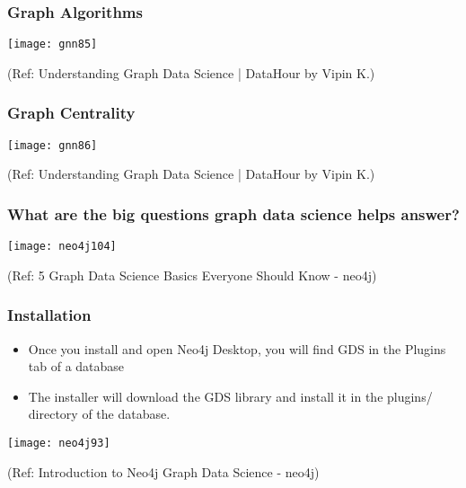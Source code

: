 \begin{frame}[fragile]\frametitle{Graph Algorithms}

\begin{center}
\texttt{[image: gnn85]}

{\tiny (Ref: Understanding Graph Data Science | DataHour by Vipin K.)}
\end{center}	  

\end{frame}

\begin{frame}[fragile]\frametitle{Graph Centrality}

\begin{center}
\texttt{[image: gnn86]}

{\tiny (Ref: Understanding Graph Data Science | DataHour by Vipin K.)}
\end{center}	  

\end{frame}
\begin{frame}\frametitle{  What are the big questions  graph data science helps answer?  }

\begin{center}
\texttt{[image: neo4j104]}
\end{center}	  


{\tiny (Ref: 5 Graph Data Science Basics Everyone Should Know - neo4j)}
\end{frame}


\begin{frame}[fragile]\frametitle{Installation}

\begin{itemize}
\item Once you install and open Neo4j Desktop, you will find GDS in the Plugins tab of a database
\item The installer will download the GDS library and install it in the plugins/ directory of the database. 
\end{itemize}

\begin{center}
\texttt{[image: neo4j93]}
\end{center}	

{\tiny (Ref: Introduction to Neo4j Graph Data Science - neo4j)}
\end{frame}

